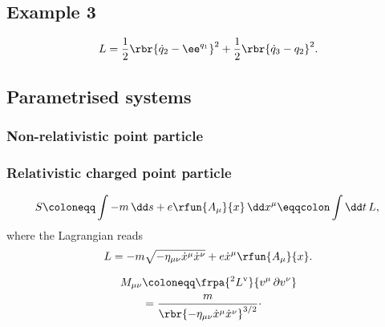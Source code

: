 \documentclass[a4paper,11pt]{article}
\begin{document}
\subsection*{Example 3}

\begin{equation}
L = \frac{1}{2} \rbr{\dot{q}_2 - \ee^{q_1}}^2 + \frac{1}{2} \rbr{\dot{q}_3 - 
q_2}^2.
\end{equation}



\subsection{Parametrised systems}

\subsubsection*{Non-relativistic point particle}

\subsubsection*{Relativistic charged point particle}

\cite[sec.\ 15]{Landau1975}
\begin{equation}
S \coloneqq \int -m\,\dd s + e \rfun{A_\mu}{x} \,\dd x^\mu \eqqcolon \int\dd 
t\, L,\\
\label{eq:point-charged}
\end{equation}
where the Lagrangian reads
\begin{equation}
L = -m \sqrt{-\eta_{\mu\nu} \dot{x}^\mu \dot{x}^\nu } + e \dot{x}^\mu 
\rfun{A_\mu}{x}.
\end{equation}

\begin{align}
M_{\mu\nu} &\coloneqq \frpa{^2 L^\text{v}}{v^\mu\,\partial v^\nu} \nonumber \\
&= \frac{m}{\rbr{-\eta_{\mu\nu} \dot{x}^\mu \dot{x}^\nu}^{3/2}} \cdot

\end{align}
\end{document}
